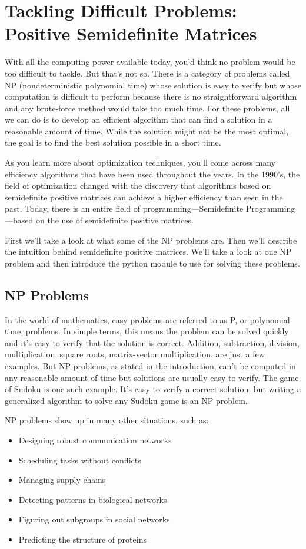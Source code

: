 \chapter{Tackling Difficult Problems: Positive Semidefinite Matrices}

With all the computing power available today, you’d think no problem would be too difficult to tackle. But that’s not so. There is a category of problems called NP (nondeterministic polynomial time) whose solution is easy to verify but whose computation is difficult to perform because there is no straightforward algorithm and any brute-force method would take too much time. For these problems, all we can do is to develop an efficient algorithm that can find a solution in a reasonable amount of time. While the solution might not be the most optimal, the goal is to find the best solution possible in a short time. 

As you learn more about optimization techniques, you’ll come across many efficiency algorithms that have been used throughout the years. In the 1990’s, the field of optimization changed with the discovery that algorithms based on  semidefinite positive matrices can achieve a higher efficiency than seen in the past. Today, there is an entire field of programming—Semidefinite Programming—based on the use of semidefinite positive matrices.

First we’ll take a look at what some of the NP problems are. Then we’ll describe the intuition behind semidefinite positive matrices. We’ll take a look at one NP problem and then introduce the python module to use for solving these problems. 

\section{NP Problems}

In the world of mathematics, easy problems are referred to as P, or polynomial time, problems. In simple terms, this means the problem can be solved quickly and it’s easy to verify that the solution is correct. Addition, subtraction, division, multiplication, square roots, matrix-vector multiplication, are just a few examples. But NP problems, as stated in the introduction, can’t be computed in any reasonable amount of time but solutions are usually easy to verify. The game of Sudoku is one such example. It’s easy to verify a correct solution, but writing a generalized algorithm to solve any Sudoku game is an NP problem. 

NP problems show up in many other situations, such as:
\begin{itemize}
\item Designing  robust communication networks
\item Scheduling tasks without conflicts
\item Managing supply chains
\item Detecting patterns in biological networks
\item Figuring out subgroups in social networks
\item Predicting the structure of proteins
\end{itemize}

